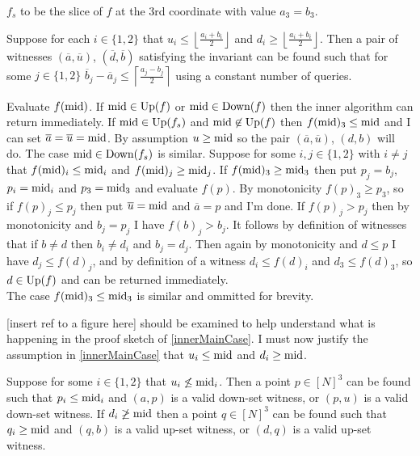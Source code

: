$f_s$ to be the slice of $f$ at the $3$rd coordinate with value $a_3 = b_3$.
\begin{lemma}\label{innerMainCase}
  Suppose for each $i \in \{1, 2\}$ that $u_i \leq \left \lfloor \frac{a_i + b_i}{2} \right \rfloor$
  and $d_i \geq \left \lfloor \frac{a_i + b_i}{2} \right\rfloor$.
  Then a pair of witnesses $(\overline{a}, \overline{u})$, $(\overline{d}, \overline{b})$ satisfying the invariant can be found
  such that for some $j \in \{1, 2\}$ $\overline{b}_j - \overline{a}_j \leq \left\lceil \frac{a_j - b_j}{2}\right \rceil$ using a constant
  number of queries. 
\end{lemma}
\begin{sproof}
  Evaluate $f(\text{mid})$. If $\text{mid} \in \text{Up}(f)$ or
  $\text{mid} \in \text{Down}(f)$ then the inner algorithm can return immediately. If $\text{mid} \in \text{Up}(f_s)$ and $\text{mid} \not\in \text{Up}(f)$
  then $f(\text{mid})_3 \leq \text{mid}$ and I can set
  $\overline{a} = \overline{u} = \text{mid}$. By assumption $u \geq \text{mid}$ so the pair $(\overline{a}, \overline{u})$, $(d, b)$ will do.
  The case $\text{mid} \in \text{Down}(f_s)$ is similar.
  Suppose for some $i, j \in \{1, 2\}$ with $i \neq j$ that $f(\text{mid})_i \leq \text{mid}_i$ and $f(\text{mid})_j \geq \text{mid}_j$.
  If $f(\text{mid})_3 \geq \text{mid}_3$ then put $p_j = b_j$, $p_i = \text{mid}_i$ and $p_3 = \text{mid}_3$ and evaluate $f(p)$.  
  By monotonicity $f(p)_3 \geq p_3$, so if $f(p)_j \leq p_j$ then put $\overline{u} = \text{mid}$ and $\overline{a} = p$ and I'm done.
  If $f(p)_j > p_j$ then by monotonicity and $b_j = p_j$ I have $f(b)_j > b_j$. It follows by definition of witnesses that if $b \neq d$ then 
  $b_i \neq d_i$ and $b_j = d_j$. Then again by monotonicity and $d \leq p$ I have $d_j \leq f(d)_j$, and by definition
  of a witness $d_i \leq f(d)_i$ and $d_3 \leq f(d)_3$, so $d \in \text{Up}(f)$ and can be returned immediately. \\
  The case $f(\text{mid})_3 \leq \text{mid}_3$ is similar and ommitted for brevity.
\end{sproof}
[insert ref to a figure here] should be examined to help understand what is happening in the proof sketch of \cref{innerMainCase}.
I must now justify the assumption in \cref{innerMainCase} that 
$u_i \leq \text{mid}$ and $d_i \geq \text{mid}$.
\begin{lemma}\label{innerOtherCase}
  Suppose for some $i \in \{1, 2\}$ that $u_i \not\leq \text{mid}_i$.
  Then a point $p \in [N]^3$ can be found such that $p_i \leq \text{mid}_i$ and $(a, p)$ is a valid down-set
  witness, or $(p, u)$ is a valid down-set witness. 
  If $d_i \not\geq \text{mid}$ then a point $q \in [N]^3$ can be found such that $q_i \geq \text{mid}$
  and $(q, b)$ is a valid up-set
  witness, or $(d, q)$ is a valid up-set witness. 
\end{lemma}
